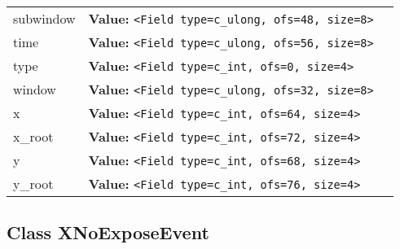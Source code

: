 \begin{longtable}{|p{\varnamewidth}|p{\vardescrwidth}|l}
\cline{1-2}
\raggedright s\-u\-b\-w\-i\-n\-d\-o\-w\- & \raggedright \textbf{Value:} 
{\tt {\textless}Field type=c\_ulong, ofs=48, size=8{\textgreater}}&\\
\cline{1-2}
\raggedright t\-i\-m\-e\- & \raggedright \textbf{Value:} 
{\tt {\textless}Field type=c\_ulong, ofs=56, size=8{\textgreater}}&\\
\cline{1-2}
\raggedright t\-y\-p\-e\- & \raggedright \textbf{Value:} 
{\tt {\textless}Field type=c\_int, ofs=0, size=4{\textgreater}}&\\
\cline{1-2}
\raggedright w\-i\-n\-d\-o\-w\- & \raggedright \textbf{Value:} 
{\tt {\textless}Field type=c\_ulong, ofs=32, size=8{\textgreater}}&\\
\cline{1-2}
\raggedright x\- & \raggedright \textbf{Value:} 
{\tt {\textless}Field type=c\_int, ofs=64, size=4{\textgreater}}&\\
\cline{1-2}
\raggedright x\-\_\-r\-o\-o\-t\- & \raggedright \textbf{Value:} 
{\tt {\textless}Field type=c\_int, ofs=72, size=4{\textgreater}}&\\
\cline{1-2}
\raggedright y\- & \raggedright \textbf{Value:} 
{\tt {\textless}Field type=c\_int, ofs=68, size=4{\textgreater}}&\\
\cline{1-2}
\raggedright y\-\_\-r\-o\-o\-t\- & \raggedright \textbf{Value:} 
{\tt {\textless}Field type=c\_int, ofs=76, size=4{\textgreater}}&\\
\cline{1-2}
\end{longtable}



\subsection{Class XNoExposeEvent}

